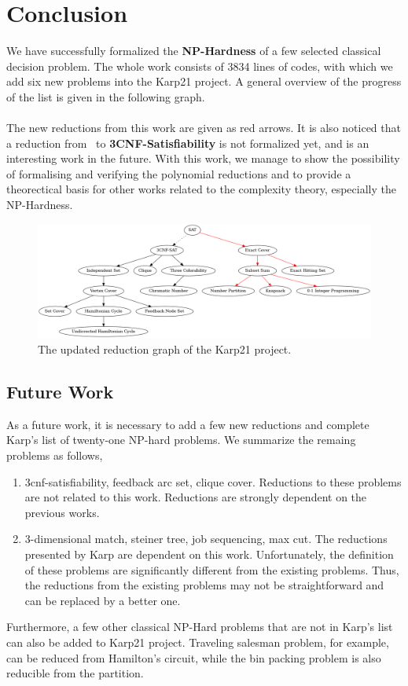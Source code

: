 \chapter{Conclusion}\label{chapter:conclusion}
We have successfully formalized the \textbf{NP-Hardness} of 
a few selected classical decision problem.  
The whole work consists of 3834 lines of codes, with which we add 
six new problems into the Karp21 project. A general overview of the 
progress of the list is given in the following graph.\\\\
The new reductions from this work are given as red arrows. 
It is also noticed that a reduction from \SAT\ to \textbf{3CNF-Satisfiability} is not 
formalized yet, and is an interesting work in the future. With this work,
we manage to show the possibility of formalising and verifying the polynomial 
reductions and to provide a theorectical basis for other works related 
to the complexity theory, especially the NP-Hardness. 
\begin{figure}[h!]
\centering 
\includegraphics[angle = 90, scale=0.39]{figures/reductions_new.png}
\caption{The updated reduction graph of the Karp21 project.}
\end{figure}

\section*{Future Work}
As a future work, it is necessary to add a few new reductions and complete Karp's 
list of twenty-one NP-hard problems. We summarize the remaing problems as follows,
\begin{enumerate}
    \item 3cnf-satisfiability, feedback arc set, clique cover. Reductions to these problems 
    are not related to this work. Reductions are strongly dependent on the previous works.
    \item 3-dimensional match, steiner tree, job sequencing, max cut. The reductions 
    presented by Karp are dependent on this work. Unfortunately, the definition of these problems 
    are significantly different from the existing problems. Thus, the reductions
    from the existing problems may not be straightforward and can be replaced by 
    a better one.
\end{enumerate}
Furthermore, a few other classical NP-Hard problems that are not in Karp's list 
can also be added to Karp21 project. Traveling salesman problem, for example, 
can be reduced from Hamilton's circuit, while the bin packing problem is also 
reducible from the partition. 
